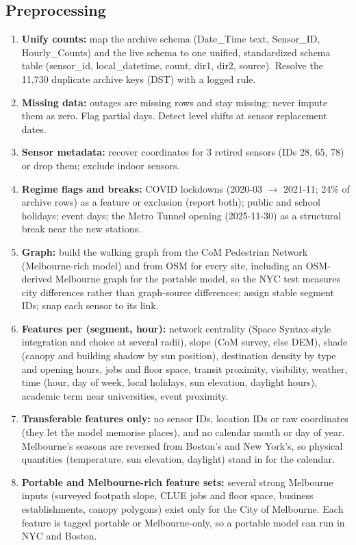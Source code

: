 \documentclass[11pt]{article}
\begin{document}
\subsection{Preprocessing}
\begin{enumerate}
  \item \textbf{Unify counts:} map the archive schema (Date\_Time text, Sensor\_ID, Hourly\_Counts) and the live schema to one unified, standardized schema table (sensor\_id, local\_datetime, count, dir1, dir2, source). Resolve the 11,730 duplicate archive keys (DST) with a logged rule.
  \item \textbf{Missing data:} outages are missing rows and stay missing; never impute them as zero. Flag partial days. Detect level shifts at sensor replacement dates.
  \item \textbf{Sensor metadata:} recover coordinates for 3 retired sensors (IDs 28, 65, 78) or drop them; exclude indoor sensors.
  \item \textbf{Regime flags and breaks:} COVID lockdowns (2020-03 $\rightarrow$ 2021-11; 24\% of archive rows) as a feature or exclusion (report both); public and school holidays; event days; the Metro Tunnel opening (2025-11-30) as a structural break near the new stations.
  \item \textbf{Graph:} build the walking graph from the CoM Pedestrian Network (Melbourne-rich model) and from OSM for every site, including an OSM-derived Melbourne graph for the portable model, so the NYC test measures city differences rather than graph-source differences; assign stable segment IDs; snap each sensor to its link.
  \item \textbf{Features per (segment, hour):} network centrality (Space Syntax-style integration and choice at several radii), slope (CoM survey, else DEM), shade (canopy and building shadow by sun position), destination density by type and opening hours, jobs and floor space, transit proximity, visibility, weather, time (hour, day of week, local holidays, sun elevation, daylight hours), academic term near universities, event proximity.
  \item \textbf{Transferable features only:} no sensor IDs, location IDs or raw coordinates (they let the model memorise places), and no calendar month or day of year. Melbourne's seasons are reversed from Boston's and New York's, so physical quantities (temperature, sun elevation, daylight) stand in for the calendar.
  \item \textbf{Portable and Melbourne-rich feature sets:} several strong Melbourne inputs (surveyed footpath slope, CLUE jobs and floor space, business establishments, canopy polygons) exist only for the City of Melbourne. Each feature is tagged portable or Melbourne-only, so a portable model can run in NYC and Boston.

\end{enumerate}
\end{document}
